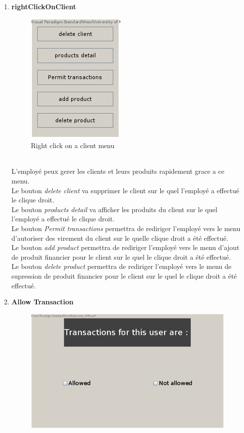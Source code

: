 \documentclass[../rapport.tex]{subfiles}
\begin{document}
\begin{enumerate}
\newpage
\item \textbf{rightClickOnClient} \\
		\begin{figure}[h!]
				\centering \includegraphics[scale=0.2]{ressources/photos_diagrammes/app2/gui/rightClickOnAClient.jpg}
				\caption{Right click on a client menu}
		\end{figure}
		\\
L'employé peux gerer les clients et leurs produits rapidement grace a ce menu.\\
Le bouton \textit{delete client} va supprimer le client sur le quel l'employé a effectué le clique droit.\\
Le bouton \textit{products detail} va afficher les produits du client sur le quel l'employé a effectué le clique droit.\\
Le bouton \textit{Permit transactions} permettra de rediriger l'employé vers le menu d'autoriser des virement du client sur le quelle clique droit a été effectué.\\
Le bouton \textit{add product} permettra de rediriger l'employé vers le menu d'ajout de produit financier pour le client sur le quel le clique droit a été effectué.\\
Le bouton \textit{delete product} permettra de rediriger l'employé vers le menu de supression de produit financier pour le client sur le quel le clique droit a été effectué.\\
\newpage
\item \textbf{Allow Transaction} \\
		\begin{figure}[h!]
				\centering \includegraphics[scale=0.2]{ressources/photos_diagrammes/app2/gui/allowTransactions.jpg}

\end{figure}
\end{enumerate}
\end{document}
